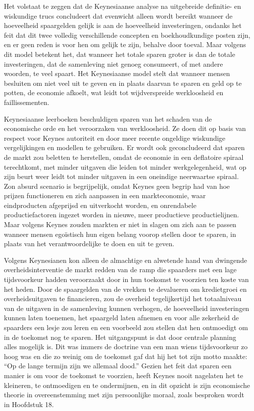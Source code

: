 Het volstaat te zeggen dat de Keynesiaanse analyse na uitgebreide definitie- en wiskundige trucs concludeert dat evenwicht alleen wordt bereikt wanneer de hoeveelheid spaargelden gelijk is aan de hoeveelheid investeringen, ondanks het feit dat dit twee volledig verschillende concepten en boekhoudkundige posten zijn, en er geen reden is voor hen om gelijk te zijn, behalve door toeval. Maar volgens dit model betekent het, dat wanneer het totale sparen groter is dan de totale investeringen, dat de samenleving niet genoeg consumeert, of met andere woorden, te veel spaart. Het Keynesiaanse model stelt dat wanneer mensen besluiten om niet veel uit te geven en in plaats daarvan te sparen en geld op te potten, de economie afkoelt, wat leidt tot wijdverspreide werkloosheid en faillissementen.

Keynesiaanse leerboeken beschuldigen sparen van het schaden van de economische orde en het veroorzaken van werkloosheid. Ze doen dit op basis van respect voor Keynes\textquotesingle{} autoriteit en door meer recente ongeldige wiskundige vergelijkingen en modellen te gebruiken. Er wordt ook geconcludeerd dat sparen de markt zou beletten te herstellen, omdat de economie in een deflatoire spiraal terechtkomt, met minder uitgaven die leiden tot minder werkgelegenheid, wat op zijn beurt weer leidt tot minder uitgaven in een oneindige neerwaartse spiraal. Zo\textquotesingle n absurd scenario is begrijpelijk, omdat Keynes geen begrip had van hoe prijzen functioneren en zich aanpassen in een markteconomie, waar eindproducten afgeprijsd en uitverkocht worden, en onrendabele productiefactoren ingezet worden in nieuwe, meer productieve productielijnen. Maar volgens Keynes zouden markten er niet in slagen om zich aan te passen wanneer mensen egoïstisch hun eigen belang voorop stellen door te sparen, in plaats van het verantwoordelijke te doen en uit te geven.

Volgens Keynesianen kon alleen de almachtige en alwetende hand van dwingende overheidsinterventie de markt redden van de ramp die spaarders met een lage tijdsvoorkeur hadden veroorzaakt door in hun toekomst te voorzien ten koste van het heden. Door de spaargelden van de vrekken te devalueren om kredietgroei en overheidsuitgaven te financieren, zou de overheid tegelijkertijd het totaalniveau van de uitgaven in de samenleving kunnen verhogen, de hoeveelheid investeringen kunnen laten toenemen, het spaargeld laten afnemen en voor alle zekerheid de spaarders een lesje zou leren en een voorbeeld zou stellen dat hen ontmoedigt om in de toekomst nog te sparen. Het uitgangspunt is dat door centrale planning alles mogelijk is. Dit was immers de doctrine van een man wiens tijdsvoorkeur zo hoog was en die zo weinig om de toekomst gaf dat hij het tot zijn motto maakte: ``Op de lange termijn zijn we allemaal dood.'' Gezien het feit dat sparen een manier is om voor de toekomst te voorzien, heeft Keynes nooit nagelaten het te kleineren, te ontmoedigen en te ondermijnen, en in dit opzicht is zijn economische theorie in overeenstemming met zijn persoonlijke moraal, zoals besproken wordt in Hoofdstuk 18.

